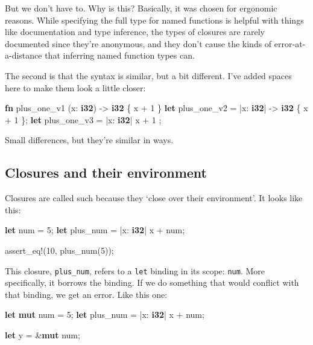 \documentclass[a4paper,]{book}
\newenvironment{Shaded}{\begin{snugshade}}{\end{snugshade}}
\newcommand{\KeywordTok}[1]{\textcolor[rgb]{0.13,0.29,0.53}{\textbf{{#1}}}}
\newcommand{\DecValTok}[1]{\textcolor[rgb]{0.00,0.00,0.81}{{#1}}}
\newcommand{\OtherTok}[1]{\textcolor[rgb]{0.56,0.35,0.01}{{#1}}}
\newcommand{\NormalTok}[1]{{#1}}
\begin{document}
But we don't have to. Why is this? Basically, it was chosen for
ergonomic reasons. While specifying the full type for named functions is
helpful with things like documentation and type inference, the types of
closures are rarely documented since they're anonymous, and they don't
cause the kinds of error-at-a-distance that inferring named function
types can.

The second is that the syntax is similar, but a bit different. I've
added spaces here to make them look a little closer:

\begin{Shaded}
\begin{Highlighting}[]
\KeywordTok{fn}  \NormalTok{plus_one_v1   (x: }\KeywordTok{i32}\NormalTok{) -> }\KeywordTok{i32} \NormalTok{\{ x + }\DecValTok{1} \NormalTok{\}}
\KeywordTok{let} \NormalTok{plus_one_v2 = |x: }\KeywordTok{i32}\NormalTok{| -> }\KeywordTok{i32} \NormalTok{\{ x + }\DecValTok{1} \NormalTok{\};}
\KeywordTok{let} \NormalTok{plus_one_v3 = |x: }\KeywordTok{i32}\NormalTok{|          x + }\DecValTok{1}  \NormalTok{;}
\end{Highlighting}
\end{Shaded}

Small differences, but they're similar in ways.

\subsection{Closures and their
environment}\label{closures-and-their-environment}

Closures are called such because they `close over their environment'. It
looks like this:

\begin{Shaded}
\begin{Highlighting}[]
\KeywordTok{let} \NormalTok{num = }\DecValTok{5}\NormalTok{;}
\KeywordTok{let} \NormalTok{plus_num = |x: }\KeywordTok{i32}\NormalTok{| x + num;}

\OtherTok{assert_eq!}\NormalTok{(}\DecValTok{10}\NormalTok{, plus_num(}\DecValTok{5}\NormalTok{));}
\end{Highlighting}
\end{Shaded}

This closure, \texttt{plus\_num}, refers to a \texttt{let} binding in
its scope: \texttt{num}. More specifically, it borrows the binding. If
we do something that would conflict with that binding, we get an error.
Like this one:

\begin{Shaded}
\begin{Highlighting}[]
\KeywordTok{let} \KeywordTok{mut} \NormalTok{num = }\DecValTok{5}\NormalTok{;}
\KeywordTok{let} \NormalTok{plus_num = |x: }\KeywordTok{i32}\NormalTok{| x + num;}

\KeywordTok{let} \NormalTok{y = &}\KeywordTok{mut} \NormalTok{num;}
\end{Highlighting}
\end{Shaded}
\end{document}
